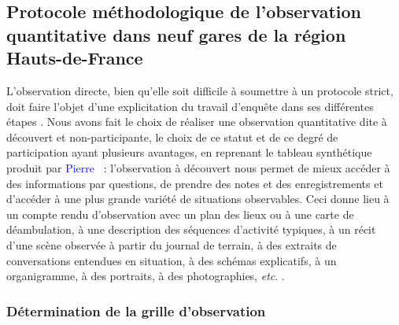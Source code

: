 \begin{refsegment}
\subsection{Protocole méthodologique de l’observation quantitative dans neuf gares de la région Hauts-de-France
    \label{chap3:methodologie-observation-quantitative}
    }

L’observation directe, bien qu’elle soit difficile à soumettre à un protocole strict, doit faire l’objet d’une explicitation du travail d’enquête dans ses différentes étapes \textcolor{blue}{\autocite[26]{arborio_observation_2007}}. Nous avons fait le choix de réaliser une observation quantitative dite à découvert et non-participante, le choix de ce statut et de ce degré de participation ayant plusieurs avantages, en reprenant le tableau synthétique produit par \textcolor{blue}{Pierre} \textcolor{blue}{\textcite[29]{fournier_observation_2010}}~: l'observation à découvert nous permet de mieux accéder à des informations par questions, de prendre des notes et des enregistrements et d'accéder à une plus grande variété de situations observables. Ceci donne lieu à un compte rendu d’observation avec un plan des lieux ou à une carte de déambulation, à une description des séquences d’activité typiques, à un récit d’une scène observée à partir du journal de terrain, à des extraits de conversations entendues en situation, à des schémas explicatifs, à un organigramme, à des portraits, à des photographies, \textsl{etc}. \textcolor{blue}{\autocite[29]{revillard_observation_2018}}.%

\subsubsection*{Détermination de la grille d'observation
    \label{chap3:grille-observation-quantitative}
    }


\end{refsegment}
